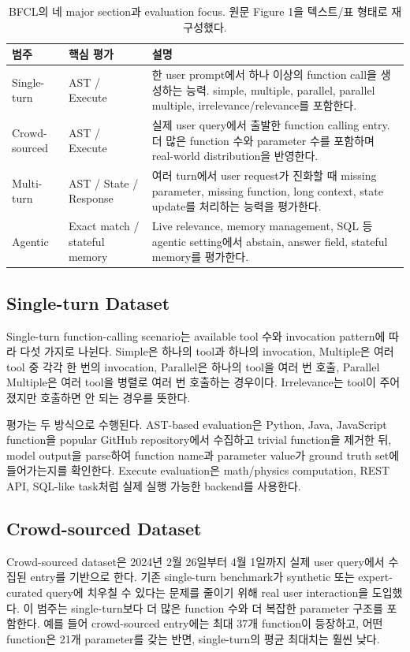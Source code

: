 \documentclass[11pt]{article}
\begin{document}
\begin{table}[h]
\centering
\begin{tabularx}{\textwidth}{p{}p{}X}
\toprule
범주 & 핵심 평가 & 설명 \\
\midrule
Single-turn & AST / Execute & 한 user prompt에서 하나 이상의 function call을 생성하는 능력. simple, multiple, parallel, parallel multiple, irrelevance/relevance를 포함한다. \\
Crowd-sourced & AST / Execute & 실제 user query에서 출발한 function calling entry. 더 많은 function 수와 parameter 수를 포함하며 real-world distribution을 반영한다. \\
Multi-turn & AST / State / Response & 여러 turn에서 user request가 진화할 때 missing parameter, missing function, long context, state update를 처리하는 능력을 평가한다. \\
Agentic & Exact match / stateful memory & Live relevance, memory management, SQL 등 agentic setting에서 abstain, answer field, stateful memory를 평가한다. \\
\bottomrule
\end{tabularx}
\caption{BFCL의 네 major section과 evaluation focus. 원문 Figure 1을 텍스트/표 형태로 재구성했다.}
\end{table}

\subsection{Single-turn Dataset}
Single-turn function-calling scenario는 available tool 수와 invocation pattern에 따라 다섯 가지로 나뉜다. Simple은 하나의 tool과 하나의 invocation, Multiple은 여러 tool 중 각각 한 번의 invocation, Parallel은 하나의 tool을 여러 번 호출, Parallel Multiple은 여러 tool을 병렬로 여러 번 호출하는 경우이다. Irrelevance는 tool이 주어졌지만 호출하면 안 되는 경우를 뜻한다.

평가는 두 방식으로 수행된다. AST-based evaluation은 Python, Java, JavaScript function을 popular GitHub repository에서 수집하고 trivial function을 제거한 뒤, model output을 parse하여 function name과 parameter value가 ground truth set에 들어가는지를 확인한다. Execute evaluation은 math/physics computation, REST API, SQL-like task처럼 실제 실행 가능한 backend를 사용한다.

\subsection{Crowd-sourced Dataset}
Crowd-sourced dataset은 2024년 2월 26일부터 4월 1일까지 실제 user query에서 수집된 entry를 기반으로 한다. 기존 single-turn benchmark가 synthetic 또는 expert-curated query에 치우칠 수 있다는 문제를 줄이기 위해 real user interaction을 도입했다. 이 범주는 single-turn보다 더 많은 function 수와 더 복잡한 parameter 구조를 포함한다. 예를 들어 crowd-sourced entry에는 최대 37개 function이 등장하고, 어떤 function은 21개 parameter를 갖는 반면, single-turn의 평균 최대치는 훨씬 낮다.
\end{document}
